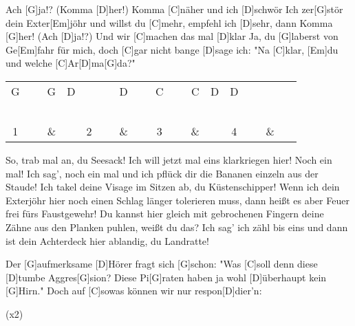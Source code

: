 \begin{guitar}
	Ach [G]ja!? (Komma [D]her!) Komma [C]näher und ich [D]schwör
	Ich zer[G]stör dein Exter[Em]jöhr und willst du [C]mehr, empfehl ich [D]sehr, dann
	Komma [G]her! (Ach [D]ja!?) Und wir [C]machen das mal [D]klar
	Ja, du [G]laberst von Ge[Em]fahr für mich, doch [C]gar nicht bange [D]sage ich:
	"Na [C]klar, [Em]du und welche [C]Ar[D]ma[G]da?"
		
	{\footnotesize \setlength{\tabcolsep}{3pt} \begin{tabular}{|cccc|cccc|cccc|cccc|}
			G & ~ & G & D & ~ & ~ & D & ~ & C & ~ & C & D & D & ~ & ~ & ~ \\
			\down & ~ & \down & \up & ~ & ~ & \down & ~ & \down & ~ & \down & \up & \down & ~ & ~ & ~ \\
			1 & ~ & \& & ~ & 2 & ~ & \& & ~ & 3 & ~ & \& & ~ & 4 & ~ & \& & ~ 
	\end{tabular}}
	
	So, trab mal an, du Seesack! Ich will jetzt mal eins klarkriegen hier! 
	Noch ein mal! Ich sag', noch ein mal und ich pflück dir die Bananen 
	einzeln aus der Staude! Ich takel deine Visage im Sitzen ab, du 
	Küstenschipper! Wenn ich dein Exterjöhr hier noch einen Schlag 
	länger tolerieren muss, dann heißt es aber Feuer frei fürs Faustgewehr! 
	Du kannst hier gleich mit gebrochenen Fingern deine Zähne aus den 
	Planken puhlen, weißt du das? Ich sag' ich zähl bis eins und dann
	ist dein Achterdeck hier ablandig, du Landratte!
	
	Der [G]aufmerksame [D]Hörer fragt sich [G]schon:
	"Was [C]soll denn diese [D]tumbe Aggres[G]sion?
	Diese Pi[G]raten haben ja wohl [D]{ü}berhaupt kein [G]Hirn."
	Doch auf [C]sowas können wir nur respon[D]dier'n:
	
	  (x2)
	
\end{guitar}